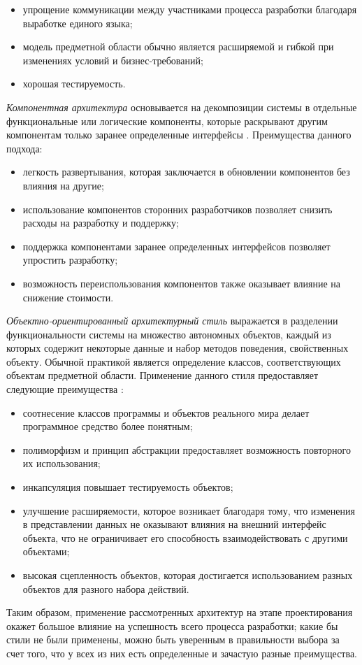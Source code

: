 \begin{itemize}
	\item упрощение коммуникации между участниками процесса разработки благодаря выработке единого языка;
	\item модель предметной области обычно является расширяемой и гибкой при изменениях условий и бизнес-требований;
	\item хорошая тестируемость.
\end{itemize} 

\emph{Компонентная архитектура} основывается на декомпозиции системы в
отдельные функциональные или логические компоненты, которые раскрывают
другим компонентам только заранее определенные интерфейсы \cite{application_architecture_guide}. Преимущества данного подхода:

\begin{itemize}
	\item легкость развертывания, которая заключается в обновлении компонентов без влияния на другие;
	\item использование компонентов сторонних разработчиков позволяет \linebreak снизить расходы на разработку и поддержку;
	\item поддержка компонентами заранее определенных интерфейсов позволяет упростить разработку;
	\item возможность переиспользования компонентов также оказывает влияние на снижение стоимости.
\end{itemize} 

\emph{Объектно-ориентированный архитектурный стиль} выражается в \linebreak разделении функциональности системы на множество автономных объектов, 
каждый из которых содержит некоторые данные и набор методов поведения, свойственных объекту. 
Обычной практикой является определение классов, соответствующих объектам предметной области. 
Применение данного стиля предоставляет следующие преимущества \cite{application_architecture_guide}:

\begin{itemize}
	\item соотнесение классов программы и объектов реального мира делает программное средство более понятным;
	\item полиморфизм и принцип абстракции предоставляет возможность повторного их использования;
	\item инкапсуляция повышает тестируемость объектов;
	\item улучшение расширяемости, которое возникает благодаря тому, что изменения в представлении данных не оказывают влияния на внешний интерфейс объекта, что не ограничивает его способность взаимодействовать с другими объектами;
  \item высокая сцепленность объектов, которая достигается использованием разных объектов для разного набора действий.
\end{itemize} 

Таким образом, применение рассмотренных архитектур на этапе проектирования окажет большое влияние на успешность всего процесса разработки;
какие бы стили не были применены, можно быть уверенным в правильности
выбора за счет того, что у всех из них есть определенные и зачастую разные
преимущества.